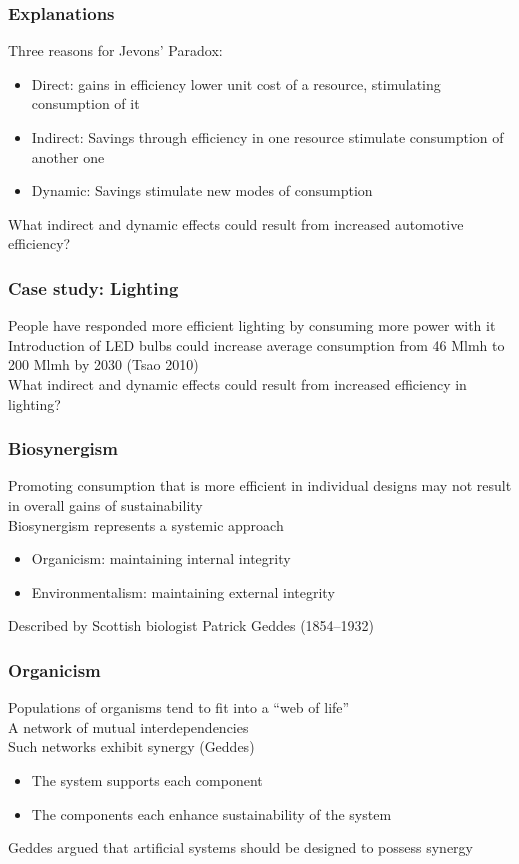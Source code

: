 \documentclass{article}
\begin{document}
\subsubsection*{Explanations}
\label{ssub:explanations}
Three reasons for Jevons’ Paradox:
\begin{itemize}
	\item Direct: gains in efficiency lower unit cost of a resource, stimulating consumption of it
	\item Indirect: Savings through efficiency in one resource stimulate consumption of another one
	\item Dynamic: Savings stimulate new modes of consumption
\end{itemize}
What indirect and dynamic effects could result from increased automotive efficiency?\\
\subsubsection*{Case study: Lighting}
\label{ssub:case_study_lighting}
People have responded more efficient lighting by consuming more power with it\\
Introduction of LED bulbs could increase average consumption from 46 Mlmh to 200 Mlmh by 2030 (Tsao 2010)\\
What indirect and dynamic effects could result from increased efficiency in lighting?\\
\subsubsection*{Biosynergism}
\label{ssub:biosynergism}
Promoting consumption that is more efficient in individual designs may not result in overall gains of sustainability\\
Biosynergism represents a systemic approach
\begin{itemize}
	\item Organicism: maintaining internal integrity
	\item Environmentalism: maintaining external integrity
\end{itemize}
Described by Scottish biologist Patrick Geddes (1854–1932)\\
\subsubsection*{Organicism}
\label{ssub:organicism}
Populations of organisms tend to fit into a “web of life”\\
A network of mutual interdependencies\\
Such networks exhibit synergy (Geddes)
\begin{itemize}
	\item The system supports each component
	\item The components each enhance sustainability of the system
\end{itemize}
Geddes argued that artificial systems should be designed to possess synergy\\
\end{document}
